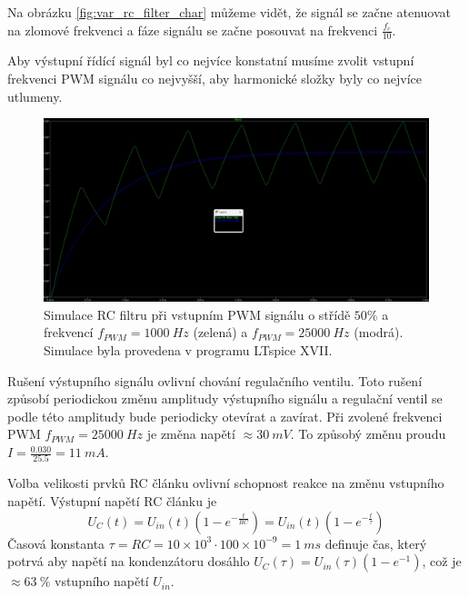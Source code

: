 Na obrázku \ref{fig:var_rc_filter_char} můžeme vidět, že signál se začne atenuovat na zlomové frekvenci a fáze signálu se začne posouvat na frekvenci $\frac{f_c}{10}$.  \par

Aby výstupní řídící signál byl co nejvíce konstatní musíme zvolit vstupní frekvenci PWM signálu co nejvyšší, aby harmonické složky byly co nejvíce utlumeny. 

\begin{figure}[H]
    \centering
    \includegraphics[width=1\linewidth]{pictures/filtered_pwm.jpg}
    \caption{Simulace RC filtru při vstupním PWM signálu o střídě $50\%$ a frekvencí $f_{PWM} = 1000 \ Hz $ (zelená) a $f_{PWM} = 25000  \ Hz $ (modrá). Simulace byla provedena v programu LTspice XVII.}
    \label{fig:filtered_pwm}
\end{figure}
Rušení výstupního signálu ovlivní chování regulačního ventilu. Toto rušení způsobí periodickou změnu amplitudy výstupního signálu a regulační ventil se podle této amplitudy bude periodicky otevírat a zavírat. Při zvolené frekvenci PWM $f_{PWM} = 25000 \ Hz $ je změna napětí $\approx 30 \ mV$. To způsobý změnu proudu $I = \frac{0.030}{25.5} = 11 \ mA $. \par

Volba velikosti prvků RC článku ovlivní schopnost reakce na změnu vstupního napětí. Výstupní napětí RC článku je 
\begin{equation}
    U_{C}(t) = U_{in}(t)(1 - e^{-\frac{t}{RC}}) = U_{in}(t)(1 - e^{-\frac{t}{\tau}})
\end{equation}
Časová konstanta $\tau = RC = 10 \times 10^{3} \cdot 100 \times 10^{-9}= 1\ ms$ definuje čas, který potrvá aby napětí na kondenzátoru dosáhlo $U_{C}(\tau) = U_{in}(\tau)(1 - e^{-1})$, což je $\approx 63 \ \% $ vstupního napětí $U_{in}$. 





